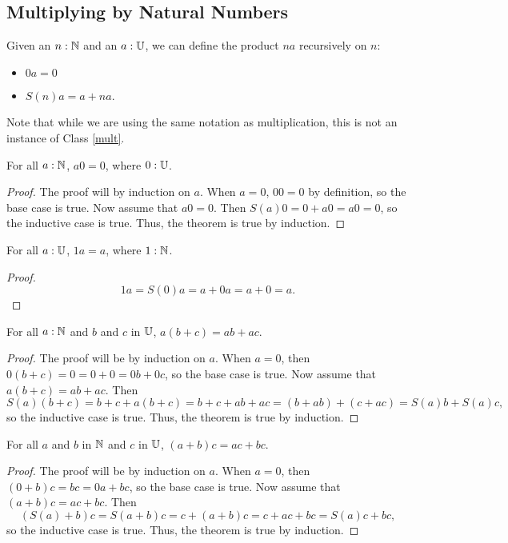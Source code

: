 \documentclass[../math.tex]{subfiles}
\begin{document}
\subsection{Multiplying by Natural Numbers}

\begin{definition}
    Given an $n : \mathbb{N}$ and an $a : \mathbb{U}$, we can define the product $na$
    recursively on $n$:
    \begin{itemize}
        \item $0a = 0$
        \item $S(n)a = a + na$.
    \end{itemize}
    Note that while we are using the same notation as multiplication, this is
    not an instance of Class \ref{mult}.
\end{definition}

\begin{theorem}
    For all $a : \mathbb{N}$, $a0 = 0$, where $0 : \mathbb{U}$.
\end{theorem}
\begin{proof}
    The proof will by induction on $a$.  When $a = 0$, $00 = 0$ by definition,
    so the base case is true.  Now assume that $a0 = 0$.  Then $S(a)0 = 0 + a0 =
    a0 = 0$, so the inductive case is true.  Thus, the theorem is true by
    induction.
\end{proof}

\begin{theorem}
    For all $a : \mathbb{U}$, $1a = a$, where $1 : \mathbb{N}$.
\end{theorem}
\begin{proof}
    \[
        1a = S(0)a = a + 0a = a + 0 = a.
    \]
\end{proof}

\begin{theorem}
    For all $a : \mathbb{N}$ and $b$ and $c$ in $\mathbb{U}$, $a(b + c) = ab + ac$.
\end{theorem}
\begin{proof}
    The proof will be by induction on $a$.  When $a = 0$, then $0(b + c) = 0 = 0
    + 0 = 0b + 0c$, so the base case is true.  Now assume that $a(b + c) = ab +
    ac$.  Then
    \[
        S(a)(b + c) = b + c + a(b + c) = b + c + ab + ac = (b + ab) + (c + ac) =
        S(a)b + S(a)c,
    \]
    so the inductive case is true.  Thus, the theorem is true by induction.
\end{proof}

\begin{theorem}
    For all $a$ and $b$ in $\mathbb{N}$ and $c$ in $\mathbb{U}$, $(a + b)c = ac + bc$.
\end{theorem}
\begin{proof}
    The proof will be by induction on $a$.  When $a = 0$, then $(0 + b)c = bc =
    0a + bc$, so the base case is true.  Now assume that $(a + b)c = ac + bc$.
    Then
    \[
        (S(a) + b)c = S(a + b)c = c + (a + b)c = c + ac + bc = S(a)c + bc,
    \]
    so the inductive case is true.  Thus, the theorem is true by induction.
\end{proof}
\end{document}
